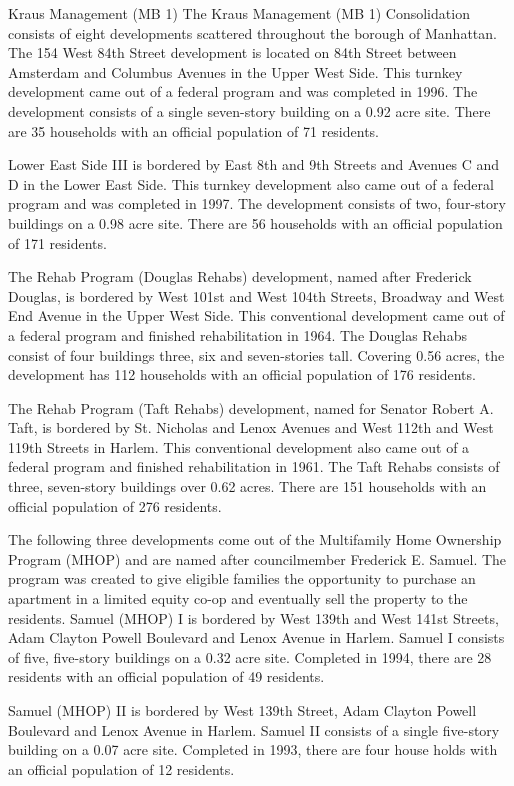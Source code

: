 Kraus Management (MB 1)
The Kraus Management (MB 1) Consolidation consists of eight developments scattered throughout the borough of Manhattan. The 154 West 84th Street development is located on 84th Street between Amsterdam and Columbus Avenues in the Upper West Side. This turnkey development came out of a federal program and was completed in 1996. The development consists of a single seven-story building on a 0.92 acre site. There are 35 households with an official population of 71 residents. 

Lower East Side III is bordered by East 8th and 9th Streets and Avenues C and D in the Lower East Side. This turnkey development also came out of a federal program and was completed in 1997. The development consists of two, four-story buildings on a 0.98 acre site. There are 56 households with an official population of 171 residents.

The Rehab Program (Douglas Rehabs) development, named after Frederick Douglas, is bordered by West 101st and West 104th Streets, Broadway and West End Avenue in the Upper West Side. This conventional development came out of a federal program and finished rehabilitation in 1964. The Douglas Rehabs consist of four buildings three, six and seven-stories tall. Covering 0.56 acres, the development has 112 households with an official population of 176 residents. 

The Rehab Program (Taft Rehabs) development, named for Senator Robert A. Taft, is bordered by St. Nicholas and Lenox Avenues and West 112th and West 119th Streets in Harlem. This conventional development also came out of a federal program and finished rehabilitation in 1961. The Taft Rehabs consists of three, seven-story buildings over 0.62 acres. There are 151 households with an official population of 276 residents.

The following three developments come out of the Multifamily Home Ownership Program (MHOP) and are named after councilmember Frederick E. Samuel. The program was created to give eligible families the opportunity to purchase an apartment in a limited equity co-op and eventually sell the property to the residents. Samuel (MHOP) I is bordered by West 139th and West 141st Streets, Adam Clayton Powell Boulevard and Lenox Avenue in Harlem. Samuel I consists of five, five-story buildings on a 0.32 acre site. Completed in 1994, there are 28 residents with an official population of 49 residents. 

Samuel (MHOP) II is bordered by West 139th Street, Adam Clayton Powell Boulevard and Lenox Avenue in Harlem. Samuel II consists of a single five-story building on a 0.07 acre site. Completed in 1993, there are four house holds with an official population of 12 residents.

